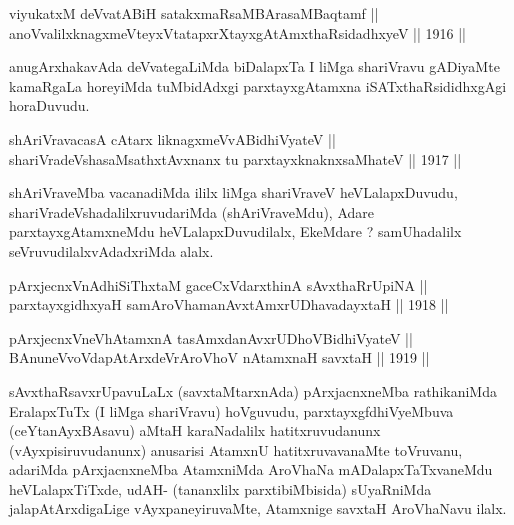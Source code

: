 \begin{shl}
viyukatxM deVvatABiH satakxmaRsaMBArasaMBaqtamf || \\
anoVvalilxknagxmeVteyxVtatapxrXtayxgAtAmxthaRsidadhxyeV \hfill || 1916 ||
  
\end{shl}

\begin{artha}
anugArxhakavAda deVvategaLiMda biDalapxTa I liMga shariVravu gADiyaMte
kamaRgaLa horeyiMda tuMbidAdxgi parxtayxgAtamxna iSATxthaRsididhxgAgi
horaDuvudu.
\end{artha}


\begin{shl}
shAriVravacasA cAtarx liknagxmeVvABidhiVyateV || \\
shariVradeVshasaMsathxtAvxnanx tu parxtayxknaknxsaMhateV \hfill || 1917 ||
  
\end{shl}

\begin{artha}
shAriVraveMba vacanadiMda ililx liMga shariVraveV heVLalapxDuvudu,
shariVradeVshadalilxruvudariMda (shAriVraveMdu), Adare
parxtayxgAtamxneMdu heVLalapxDuvudilalx, EkeMdare ? samUhadalilx
seVruvudilalxvAdadxriMda alalx.
\end{artha}


\begin{shl}
pArxjecnxVnAdhiSiThxtaM gaceCxVdarxthinA sAvxthaRrUpiNA || \\
parxtayxgidhxyaH samAroVhamanAvxtAmx\s \s rUDhavadayxtaH \hfill || 1918 ||
  
\end{shl}

\begin{shl}
pArxjecnxVneVhA\s \s tamxnA tasAmxdanAvxrUDhoV\s BidhiVyateV ||  \\
\footnotemark[1]BAnuneVvoVdapAtArxdeVrAroVhoV nA\s \s tamxnaH savxtaH \hfill || 1919 ||
  
\end{shl}

\begin{artha}
sAvxthaRsavxrUpavuLaLx (savxtaMtarxnAda) pArxjacnxneMba
rathikaniMda EralapxTuTx (I liMga shariVravu) hoVguvudu, parxtayxgfdhiVyeMbuva (ceYtanAyxBAsavu) aMtaH karaNadalilx hatitxruvudanunx (vAyxpisiruvudanunx) anusarisi AtamxnU hatitxruvavanaMte toVruvanu, adariMda pArxjacnxneMba AtamxniMda AroVhaNa mADalapxTaTxvaneMdu heVLalapxTiTxde, udAH- (tananxlilx parxtibiMbisida) sUyaRniMda jalapAtArxdigaLige vAyxpaneyiruvaMte, Atamxnige savxtaH AroVhaNavu ilalx. 
\end{artha}

